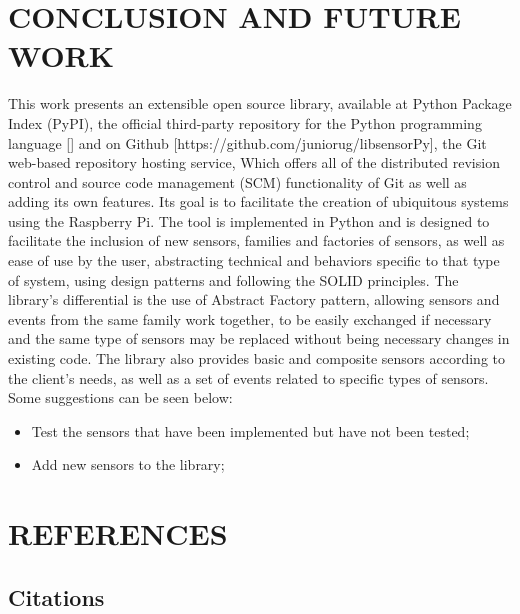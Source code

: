 \documentclass{acm_proc_article-sp}
\begin{document}
\section{CONCLUSION AND FUTURE WORK}
This work presents an extensible open source library, available at Python Package Index (PyPI), the official third-party repository for the Python programming language [] %
and on Github [https://github.com/juniorug/libsensorPy], the Git web-based repository hosting service, Which offers all of the distributed revision control and source code management (SCM) functionality of Git as well as adding its own features.
\newline
\newline
Its goal is to facilitate the creation of ubiquitous systems using the Raspberry Pi. The tool is implemented in Python and is designed to facilitate the inclusion of new sensors, families and factories of sensors, as well as ease of use by the user, abstracting technical and behaviors specific to that type of system, using design patterns and following the SOLID principles.
\newline
\newline
The library's differential is the use of Abstract Factory pattern, allowing sensors and events from the same family work together, to be easily exchanged if necessary and the same type of sensors may be replaced without being necessary changes in existing code. The library also provides basic and composite  sensors according to the client's needs, as well as a set of events related to specific types of sensors.
\newline
\newline
Some suggestions can be seen below:
\begin{itemize}
\item Test the sensors that have been implemented but have not been tested;
\item Add new sensors to the library;

\end{itemize}
\section{REFERENCES}

\subsection{Citations}
\end{document}
